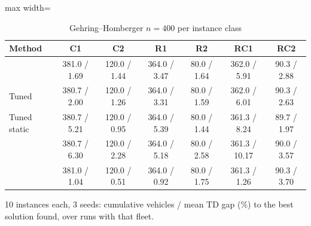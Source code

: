 \begin{table}[t]
\centering
\caption{Gehring--Homberger $n=400$ per instance class}\label{tab:hgclass}
\setlength{\tabcolsep}{2pt}
\begin{adjustbox}{max width=\linewidth}
\begin{tabular}{lcccccc}
\toprule
Method & C1 & C2 & R1 & R2 & RC1 & RC2\\ \midrule
\Rw{} & 381.0 / 1.69 & 120.0 / 1.44 & 364.0 / 3.47 & 80.0 / 1.64 & 362.0 / 5.91 & 90.3 / 2.88\\
Tuned \Rw{} & 380.7 / 2.00 & 120.0 / 1.26 & 364.0 / 3.31 & 80.0 / 1.59 & 362.0 / 6.01 & 90.3 / 2.63\\
Tuned static & 380.7 / 5.21 & 120.0 / 0.95 & 364.0 / 5.39 & 80.0 / 1.44 & 361.3 / 8.24 & 89.7 / 1.97\\
\sgalns{} & 380.7 / 6.30 & 120.0 / 2.28 & 364.0 / 5.18 & 80.0 / 2.58 & 361.3 / 10.17 & 90.0 / 3.57\\
\sgc{} & 381.0 / 1.04 & 120.0 / 0.51 & 364.0 / 0.92 & 80.0 / 1.75 & 361.3 / 1.26 & 90.3 / 3.70\\
\bottomrule
\end{tabular}
\end{adjustbox}
\par\vspace{2pt}\parbox{\linewidth}{\footnotesize 10 instances each, 3 seeds: cumulative vehicles / mean TD gap (\%) to the best solution found, over runs with that fleet.}
\end{table}
